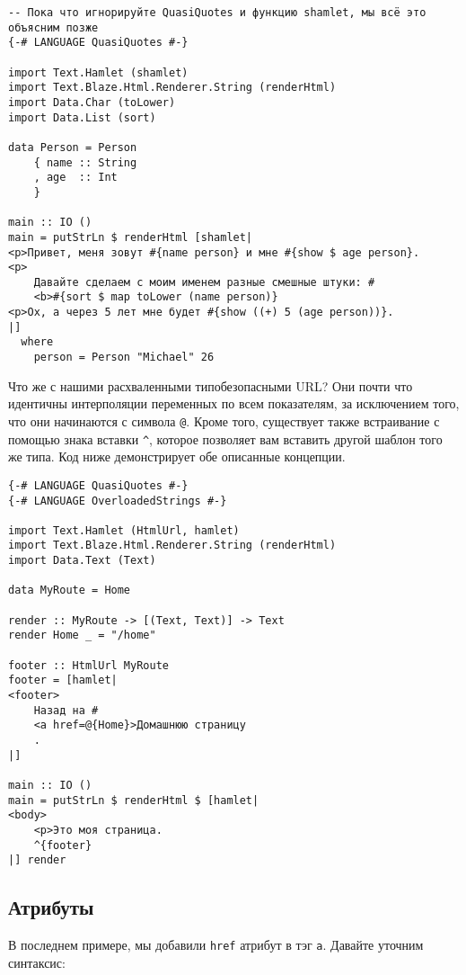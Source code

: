 \begin{lstlisting}
-- Пока что игнорируйте QuasiQuotes и функцию shamlet, мы всë это объясним позже
{-# LANGUAGE QuasiQuotes #-}

import Text.Hamlet (shamlet)
import Text.Blaze.Html.Renderer.String (renderHtml)
import Data.Char (toLower)
import Data.List (sort)

data Person = Person
    { name :: String
    , age  :: Int
    }

main :: IO ()
main = putStrLn $ renderHtml [shamlet|
<p>Привет, меня зовут #{name person} и мне #{show $ age person}.
<p>
    Давайте сделаем с моим именем разные смешные штуки: #
    <b>#{sort $ map toLower (name person)}
<p>Ох, а через 5 лет мне будет #{show ((+) 5 (age person))}.
|]
  where
    person = Person "Michael" 26
\end{lstlisting}

Что же с нашими расхваленными типобезопасными URL? Они почти что идентичны
интерполяции переменных по всем показателям, за исключением того, что они
начинаются с символа \texttt{@}. Кроме того, существует также встраивание с помощью
знака вставки \verb'^', которое позволяет вам вставить другой шаблон того же типа.
Код ниже демонстрирует обе описанные концепции.

\begin{lstlisting}
{-# LANGUAGE QuasiQuotes #-}
{-# LANGUAGE OverloadedStrings #-}

import Text.Hamlet (HtmlUrl, hamlet)
import Text.Blaze.Html.Renderer.String (renderHtml)
import Data.Text (Text)

data MyRoute = Home

render :: MyRoute -> [(Text, Text)] -> Text
render Home _ = "/home"

footer :: HtmlUrl MyRoute
footer = [hamlet|
<footer>
    Назад на #
    <a href=@{Home}>Домашнюю страницу
    .
|]

main :: IO ()
main = putStrLn $ renderHtml $ [hamlet|
<body>
    <p>Это моя страница.
    ^{footer}
|] render
\end{lstlisting}

\subsection{Атрибуты}
В последнем примере, мы добавили \texttt{href} атрибут в тэг \texttt{a}. Давайте
уточним синтаксис:


